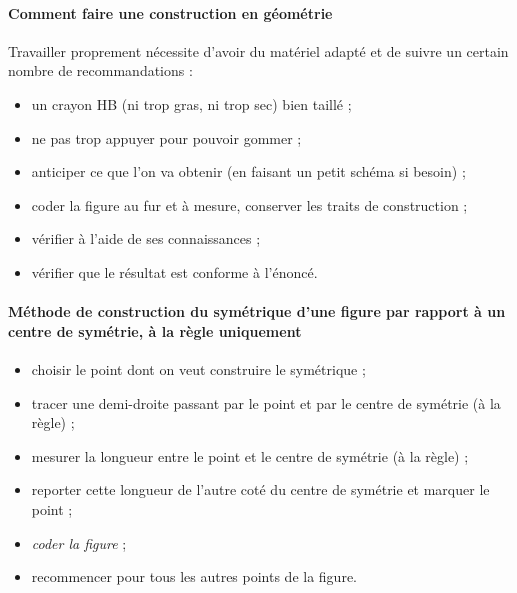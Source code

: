 \paragraph{Comment faire une construction en géométrie}
Travailler proprement nécessite d'avoir du matériel adapté et de suivre un certain nombre de recommandations :
\begin{itemize}
    \item un crayon HB (ni trop gras, ni trop sec) bien taillé ;
    \item ne pas trop appuyer pour pouvoir gommer ;
    \item anticiper ce que l'on va obtenir (en faisant un petit schéma si besoin) ;
    \item coder la figure au fur et à mesure, conserver les traits de construction ;
    \item vérifier à l'aide de ses connaissances ;
    \item vérifier que le résultat est conforme à l'énoncé.
\end{itemize}

\paragraph{Méthode de construction du symétrique d'une figure par rapport à un centre de symétrie, à la règle uniquement}
\begin{itemize}
    \item choisir le point dont on veut construire le symétrique ;
    \item tracer une demi-droite passant par le point et par le centre de symétrie (à la règle) ;
    \item mesurer la longueur entre le point et le centre de symétrie (à la règle) ;
    \item reporter cette longueur de l'autre coté du centre de symétrie et marquer le point ;
    \item \textit{coder la figure} ;
    \item recommencer pour tous les autres points de la figure.
\end{itemize}

